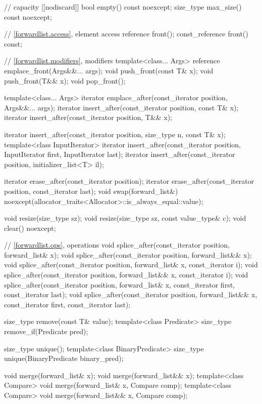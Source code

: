 \begin{codeblock}
{{    // capacity
    [[nodiscard]] bool empty() const noexcept;
    size_type max_size() const noexcept;

    // \ref{forwardlist.access}, element access
    reference front();
    const_reference front() const;

    // \ref{forwardlist.modifiers}, modifiers
    template<class... Args> reference emplace_front(Args&&... args);
    void push_front(const T& x);
    void push_front(T&& x);
    void pop_front();

    template<class... Args> iterator emplace_after(const_iterator position, Args&&... args);
    iterator insert_after(const_iterator position, const T& x);
    iterator insert_after(const_iterator position, T&& x);

    iterator insert_after(const_iterator position, size_type n, const T& x);
    template<class InputIterator>
      iterator insert_after(const_iterator position, InputIterator first, InputIterator last);
    iterator insert_after(const_iterator position, initializer_list<T> il);

    iterator erase_after(const_iterator position);
    iterator erase_after(const_iterator position, const_iterator last);
    void swap(forward_list&)
      noexcept(allocator_traits<Allocator>::is_always_equal::value);

    void resize(size_type sz);
    void resize(size_type sz, const value_type& c);
    void clear() noexcept;

    // \ref{forwardlist.ops},  operations
    void splice_after(const_iterator position, forward_list& x);
    void splice_after(const_iterator position, forward_list&& x);
    void splice_after(const_iterator position, forward_list& x, const_iterator i);
    void splice_after(const_iterator position, forward_list&& x, const_iterator i);
    void splice_after(const_iterator position, forward_list& x,
                      const_iterator first, const_iterator last);
    void splice_after(const_iterator position, forward_list&& x,
                      const_iterator first, const_iterator last);

    size_type remove(const T& value);
    template<class Predicate> size_type remove_if(Predicate pred);

    size_type unique();
    template<class BinaryPredicate> size_type unique(BinaryPredicate binary_pred);

    void merge(forward_list& x);
    void merge(forward_list&& x);
    template<class Compare> void merge(forward_list& x, Compare comp);
    template<class Compare> void merge(forward_list&& x, Compare comp);

}}
\end{codeblock}
